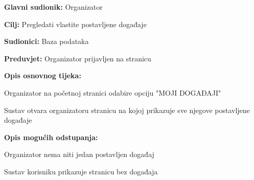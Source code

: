 					\noindent {}
\begin{packed_item}
	\item \textbf{Glavni sudionik:} Organizator
	\item  \textbf{Cilj:} Pregledati vlastite postavljene događaje 
	\item  \textbf{Sudionici:} Baza podataka
	\item  \textbf{Preduvjet:} Organizator prijavljen na stranicu
	\item  \textbf{Opis osnovnog tijeka:}
	
	\item[] \begin{packed_enum}
		
		\item Organizator na početnoj stranici odabire opciju "MOJI DOGAĐAJI"
		\item Sustav otvara organizatoru stranicu na kojoj prikazuje sve njegove postavljene događaje
	\end{packed_enum}
	
	\item  \textbf{Opis mogućih odstupanja:}
	
	\item[] \begin{packed_item}
		
		\item[2.a] Organizator nema niti jedan postavljen događaj
		\item[] \begin{packed_enum}
			
			\item Sustav korisniku prikazuje stranicu bez događaja
			
		\end{packed_enum}
	\end{packed_item}
\end{packed_item}

